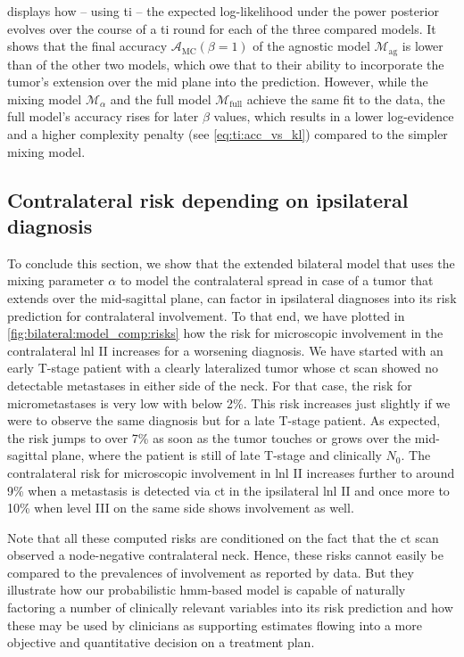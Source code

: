 \documentclass[\relativeRoot/main.tex]{subfiles}
\begin{document}
 displays how -- using \gls{ti} -- the expected log-likelihood under the power posterior evolves over the course of a \gls{ti} round for each of the three compared models. It shows that the final accuracy $\mathcal{A}_\text{MC}(\beta=1)$ of the agnostic model $\mathcal{M}_\text{ag}$ is lower than of the other two models, which owe that to their ability to incorporate the tumor's extension over the mid plane into the prediction. However, while the mixing model $\mathcal{M}_\alpha$ and the full model $\mathcal{M}_\text{full}$ achieve the same fit to the data, the full model's accuracy rises for later $\beta$ values, which results in a lower log-evidence and a higher complexity penalty (see \cref{eq:ti:acc_vs_kl}) compared to the simpler mixing model.

\subsection{Contralateral risk depending on ipsilateral diagnosis}
\label{subsec:bilateral:model_comp:risk}

To conclude this section, we show that the extended bilateral model that uses the mixing parameter $\alpha$ to model the contralateral spread in case of a tumor that extends over the mid-sagittal plane, can factor in ipsilateral diagnoses into its risk prediction for contralateral involvement. To that end, we have plotted in \cref{fig:bilateral:model_comp:risks} how the risk for microscopic involvement in the contralateral \gls{lnl} II increases for a worsening diagnosis. We have started with an early T-stage patient with a clearly lateralized tumor whose \gls{ct} scan showed no detectable metastases in either side of the neck. For that case, the risk for micrometastases is very low with below 2\%. This risk increases just slightly if we were to observe the same diagnosis but for a late T-stage patient. As expected, the risk jumps to over 7\% as soon as the tumor touches or grows over the mid-sagittal plane, where the patient is still of late T-stage and clinically $N_0$. The contralateral risk for microscopic involvement in \gls{lnl} II increases further to around 9\% when a metastasis is detected via \gls{ct} in the ipsilateral \gls{lnl} II and once more to 10\% when level III on the same side shows involvement as well.

Note that all these computed risks are conditioned on the fact that the \gls{ct} scan observed a node-negative contralateral neck. Hence, these risks cannot easily be compared to the prevalences of involvement as reported by data. But they illustrate how our probabilistic \acrshort{hmm}-based model is capable of naturally factoring a number of clinically relevant variables into its risk prediction and how these may be used by clinicians as supporting estimates flowing into a more objective and quantitative decision on a treatment plan.
\end{document}
